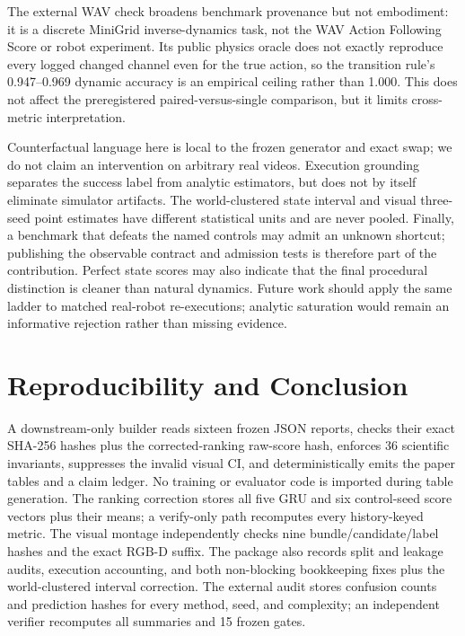 \documentclass[letterpaper,10pt,conference]{ieeeconf}
\begin{document}
The external WAV check broadens benchmark provenance but not embodiment: it is
a discrete MiniGrid inverse-dynamics task, not the WAV Action Following Score
or robot experiment. Its public physics oracle does not exactly reproduce every
logged changed channel even for the true action, so the transition rule's
0.947--0.969 dynamic accuracy is an empirical ceiling rather than 1.000. This
does not affect the preregistered paired-versus-single comparison, but it limits
cross-metric interpretation.

Counterfactual language here is local to the frozen generator and exact swap;
we do not claim an intervention on arbitrary real videos. Execution grounding
separates the success label from analytic estimators, but does not by itself
eliminate simulator artifacts. The world-clustered state interval and visual
three-seed point estimates have different statistical units and are never
pooled. Finally, a benchmark that defeats the named controls may admit an
unknown shortcut; publishing the observable contract and admission tests is
therefore part of the contribution. Perfect state scores may also indicate
that the final procedural distinction is cleaner than natural dynamics. Future
work should apply the same ladder to matched real-robot re-executions; analytic
saturation would remain an informative rejection rather than missing evidence.

\section{Reproducibility and Conclusion}

A downstream-only builder reads sixteen frozen JSON reports, checks their exact
SHA-256 hashes plus the corrected-ranking raw-score hash, enforces 36
scientific invariants, suppresses the invalid visual CI, and deterministically
emits the paper tables and a claim ledger. No training or evaluator code is
imported during table generation. The ranking correction stores all five GRU
and six control-seed score vectors plus their means; a verify-only path
recomputes every history-keyed metric. The visual montage independently checks
nine bundle/candidate/label hashes and the exact RGB-D suffix. The package also
records split and leakage audits, execution accounting, and both non-blocking
bookkeeping fixes plus the world-clustered interval correction. The external
audit stores confusion counts and prediction hashes for every method, seed, and
complexity; an independent verifier recomputes all summaries and 15 frozen gates.
\end{document}
